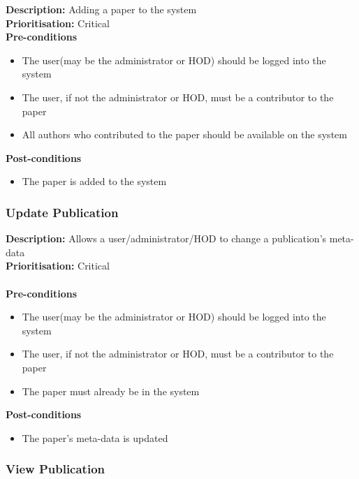 \documentclass[a4paper]{article}
\begin{document}
    \textbf{Description:} Adding a paper to the system\\
    \textbf{Prioritisation:} Critical\\
    
    
    \textbf{Pre-conditions}
     \begin{itemize}
        \item The user(may be the administrator or HOD) should be logged into the system
        \item The user, if not the administrator or HOD, must be a contributor to the paper
        \item All authors who contributed to the paper should be available on the system
   \end{itemize}
    
    \textbf{Post-conditions}
    \begin{itemize}
        \item The paper is added to the system
    \end{itemize}

    \subsubsection{Update Publication}
    
    \textbf{Description:} Allows a user/administrator/HOD to change a publication's meta-data\\
    \textbf{Prioritisation:} Critical\\
    \\
    
    \textbf{Pre-conditions}
     \begin{itemize}
        \item The user(may be the administrator or HOD) should be logged into the system
        \item The user, if not the administrator or HOD, must be a contributor to the paper
        \item The paper must already be in the system
   \end{itemize}
    
    \textbf{Post-conditions}
    \begin{itemize}
        \item The paper's meta-data is updated
    \end{itemize}
    
    \subsubsection{View Publication}
    
\end{document}
